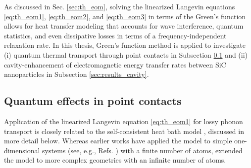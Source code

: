 As discussed in Sec. \ref{sec:th_eom}, solving the linearized Langevin equations \eqref{eq:th_eom1}, \eqref{eq:th_eom2}, and \eqref{eq:th_eom3} in terms of the Green's function allows for heat transfer modeling that accounts for wave interference, quantum statistics, and even dissipative losses in terms of a frequency-independent relaxation rate. In this thesis, Green's function method is applied to investigate (i) quantum thermal transport through point contacts in Subsection \ref{sec:results_schb} and (ii) cavity-enhancement of electromagnetic energy transfer rates between SiC nanoparticles in Subsection \ref{sec:results_cavity}. %

\subsection{Quantum effects in point contacts}
\label{sec:results_schb}

Application of the linearized Langevin equation \eqref{eq:th_eom1} for lossy phonon transport is closely related to the self-consistent heat bath model \cite{bolsterli70}, discussed in more detail below. Whereas earlier works have applied the model to simple one-dimensional systems (see, e.g., Refs. \cite{bolsterli70,visscher75,dhar03,dhar06,segal09,bandyopadhyay11}) with a finite number of atoms,  extended the model to more complex geometries with an infinite number of atoms.  %

